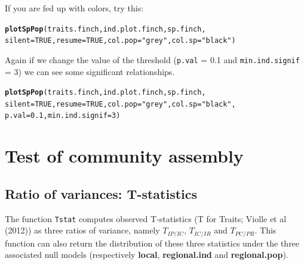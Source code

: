 \documentclass[12pt]{article}\usepackage[]{graphicx}\usepackage[]{color}
\makeatletter
\newcommand{\hlnum}[1]{\textcolor[rgb]{0.686,0.059,0.569}{#1}}%
\newcommand{\hlstr}[1]{\textcolor[rgb]{0.192,0.494,0.8}{#1}}%
\newcommand{\hlstd}[1]{\textcolor[rgb]{0.345,0.345,0.345}{#1}}%
\newcommand{\hlkwc}[1]{\textcolor[rgb]{0.333,0.667,0.333}{#1}}%
\newcommand{\hlkwd}[1]{\textcolor[rgb]{0.737,0.353,0.396}{\textbf{#1}}}%
\newenvironment{kframe}{%
 \def\at@end@of@kframe{}%
 \ifinner\ifhmode%
  \def\at@end@of@kframe{\end{minipage}}%
  \begin{minipage}{\columnwidth}%
 \fi\fi%
 \def\FrameCommand##1{\hskip\@totalleftmargin \hskip-\fboxsep
 \colorbox{shadecolor}{##1}\hskip-\fboxsep
     \hskip-\linewidth \hskip-\@totalleftmargin \hskip\columnwidth}%
 \MakeFramed {\advance\hsize-\width
   \@totalleftmargin\z@ \linewidth\hsize
   \@setminipage}}%
 {\par\unskip\endMakeFramed%
 \at@end@of@kframe}
\newenvironment{knitrout}{}{} %
\makeatother
\begin{document}
If you are fed up with colors, try this:
\begin{knitrout}
\color{fgcolor}\begin{kframe}
\begin{alltt}
\hlkwd{plotSpPop}\hlstd{(traits.finch, ind.plot.finch, sp.finch,}
      \hlkwc{silent} \hlstd{=} \hlnum{TRUE}\hlstd{,} \hlkwc{resume} \hlstd{=} \hlnum{TRUE}\hlstd{,} \hlkwc{col.pop} \hlstd{=} \hlstr{"grey"}\hlstd{,} \hlkwc{col.sp} \hlstd{=} \hlstr{"black"}\hlstd{)}
\end{alltt}


{\ttfamily\noindent\bfseries{}}\end{kframe}
\end{knitrout}

Again if we change the value of the threshold (\texttt{p.val} = 0.1 and \texttt{min.ind.signif} = 3) we can see some significant relationships.

\begin{knitrout}
\color{fgcolor}\begin{kframe}
\begin{alltt}
\hlkwd{plotSpPop}\hlstd{(traits.finch, ind.plot.finch, sp.finch,}
      \hlkwc{silent} \hlstd{=} \hlnum{TRUE}\hlstd{,} \hlkwc{resume} \hlstd{=} \hlnum{TRUE}\hlstd{,} \hlkwc{col.pop} \hlstd{=} \hlstr{"grey"}\hlstd{,} \hlkwc{col.sp} \hlstd{=} \hlstr{"black"}\hlstd{,}
      \hlkwc{p.val} \hlstd{=} \hlnum{0.1}\hlstd{,} \hlkwc{min.ind.signif} \hlstd{=} \hlnum{3}\hlstd{)}
\end{alltt}


{\ttfamily\noindent\bfseries{}}\end{kframe}
\end{knitrout}


\newpage

\section{Test of community assembly}

\subsection{Ratio of variances: T-statistics}

The function \texttt{Tstat} computes observed T-statistics (T for Traits; Violle et al (2012)) as three ratios of variance, namely $T_{IP/IC}$, $T_{IC/IR}$ and $T_{PC/PR}$. This function can also return the distribution of these three statistics under the three associated null models (respectively \textbf{local}, \textbf{regional.ind} and \textbf{regional.pop}).
\\
\end{document}
